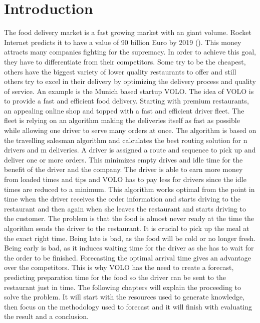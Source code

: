 \chapter{Introduction}\label{chapter:Introduction}

\renewcommand{\thepage}{\arabic{page}}
\setcounter{page}{1}

The food delivery market is a fast growing market with an giant volume. Rocket Internet predicts it to have a value of 90 billion Euro by 2019 (\cite{Rocket}). This money attracts many companies fighting for the supremacy. In order to achieve this goal, they have to differentiate from their competitors. Some try to be the cheapest, others have the biggest variety of lower quality restaurants to offer and still others try to excel in their delivery by optimizing the delivery process and quality of service.\newline
An example is the Munich based startup VOLO. The idea of VOLO is to provide a fast and efficient food delivery. Starting with premium restaurants, an appealing online shop and topped with a fast and efficient driver fleet. The fleet is relying on an algorithm making the deliveries itself as fast as possible while allowing one driver to serve many orders at once. The algorithm is based on the travelling salesman algorithm and calculates the best routing solution for n drivers and m deliveries. A driver is assigned a route and sequence to pick up and deliver one or more orders. This minimizes empty drives and idle time for the benefit of the driver and the company. The driver is able to earn more money from loaded times and tips and VOLO has to pay less for drivers since the idle times are reduced to a minimum.\newline
This algorithm works optimal from the point in time when the driver receives the order information and starts driving to the restaurant and then again when she leaves the restaurant and starts driving to the customer. The problem is that the food is almost never ready at the time the algorithm sends the driver to the restaurant. It is crucial to pick up the meal at the exact right time. Being late is bad, as the food will be cold or no longer fresh. Being early is bad, as it induces waiting time for the driver as she has to wait for the order to be finished. Forecasting the optimal arrival time gives an advantage over the competitors.\newline
This is why VOLO has the need to create a forecast, predicting preparation time for the food so the driver can be sent to the restaurant just in time.\newline
The following chapters will explain the proceeding to solve the problem. It will start with the resources used to generate knowledge, then focus on the methodology used to forecast and it will finish with evaluating the result and a conclusion.
